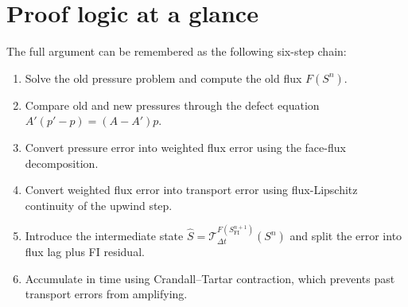 \documentclass[11pt]{article}
\begin{document}
\section{Proof logic at a glance}\label{sec:logic}

The full argument can be remembered as the following six-step chain:
\begin{enumerate}
\item Solve the old pressure problem and compute the old flux $F(S^n)$.
\item Compare old and new pressures through the defect equation
      $A'(p'-p) = (A - A')p$.
\item Convert pressure error into weighted flux error using the face-flux
      decomposition.
\item Convert weighted flux error into transport error using flux-Lipschitz
      continuity of the upwind step.
\item Introduce the intermediate state
      $\widehat{S} = \mathcal{T}^{F(S^{n+1}_{\mathrm{FI}})}_{\Delta t}(S^n)$
      and split the error into flux lag plus FI residual.
\item Accumulate in time using Crandall--Tartar contraction, which prevents
      past transport errors from amplifying.
\end{enumerate}
\end{document}
